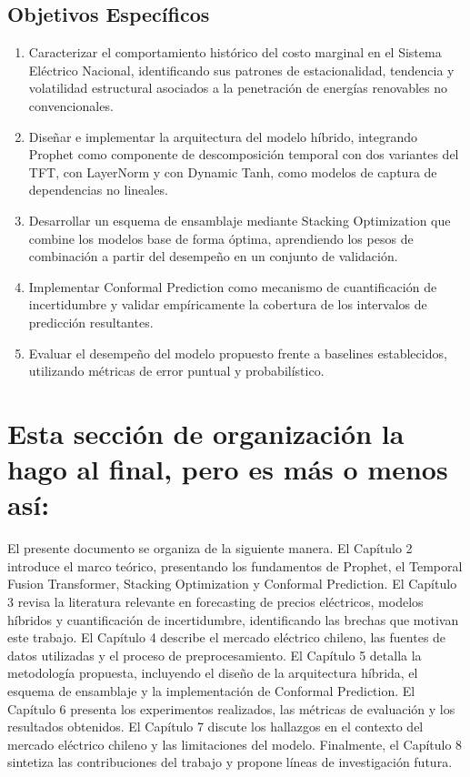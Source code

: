 \subsection{Objetivos Específicos}

\begin{enumerate}
    \item Caracterizar el comportamiento histórico del costo marginal en el Sistema Eléctrico Nacional, identificando sus patrones de estacionalidad, tendencia y volatilidad estructural asociados a la penetración de energías renovables no convencionales.

    \item Diseñar e implementar la arquitectura del modelo híbrido, integrando Prophet como componente de descomposición temporal con dos variantes del TFT, con LayerNorm y con Dynamic Tanh, como modelos de captura de dependencias no lineales.

    \item Desarrollar un esquema de ensamblaje mediante Stacking Optimization que combine los modelos base de forma óptima, aprendiendo los pesos de combinación a partir del desempeño en un conjunto de validación.
    
    \item Implementar Conformal Prediction como mecanismo de cuantificación de incertidumbre y validar empíricamente la cobertura de los intervalos de predicción resultantes.
    
    \item Evaluar el desempeño del modelo propuesto frente a baselines establecidos, utilizando métricas de error puntual y probabilístico.
\end{enumerate}

\section{Esta sección de organización la hago al final, pero es más o menos así:}

El presente documento se organiza de la siguiente manera. El Capítulo 2 introduce el marco teórico, presentando los fundamentos de Prophet, el Temporal Fusion Transformer, Stacking Optimization y Conformal Prediction. El Capítulo 3 revisa la literatura relevante en forecasting de precios eléctricos, modelos híbridos y cuantificación de incertidumbre, identificando las brechas que motivan este trabajo. El Capítulo 4 describe el mercado eléctrico chileno, las fuentes de datos utilizadas y el proceso de preprocesamiento. El Capítulo 5 detalla la metodología propuesta, incluyendo el diseño de la arquitectura híbrida, el esquema de ensamblaje y la implementación de Conformal Prediction. El Capítulo 6 presenta los experimentos realizados, las métricas de evaluación y los resultados obtenidos. El Capítulo 7 discute los hallazgos en el contexto del mercado eléctrico chileno y las limitaciones del modelo. Finalmente, el Capítulo 8 sintetiza las contribuciones del trabajo y propone líneas de investigación futura.

